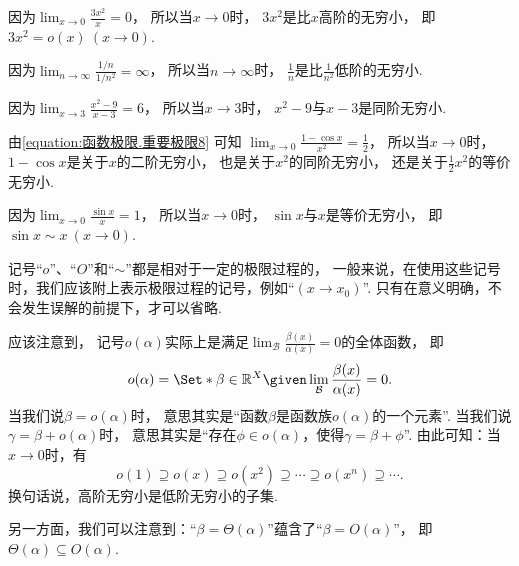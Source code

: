 \begin{example}
因为\(\lim_{x\to0} \frac{3x^2}{x} = 0\)，
所以当\(x\to0\)时，
\(3x^2\)是比\(x\)高阶的无穷小，
即\(3x^2 = o(x)\ (x\to0)\).
\end{example}

\begin{example}
因为\(\lim_{n\to\infty} \frac{1/n}{1/n^2} = \infty\)，
所以当\(n\to\infty\)时，
\(\frac{1}{n}\)是比\(\frac{1}{n^2}\)低阶的无穷小.
\end{example}

\begin{example}
因为\(\lim_{x\to3} \frac{x^2-9}{x-3} = 6\)，
所以当\(x\to3\)时，
\(x^2-9\)与\(x-3\)是同阶无穷小.
\end{example}

\begin{example}
由\cref{equation:函数极限.重要极限8} 可知
\(\lim_{x\to0} \frac{1-\cos x}{x^2} = \frac12\)，
所以当\(x\to0\)时，
\(1-\cos x\)是关于\(x\)的二阶无穷小，
也是关于\(x^2\)的同阶无穷小，
还是关于\(\frac12 x^2\)的等价无穷小.
\end{example}

\begin{example}
因为\(\lim_{x\to0} \frac{\sin x}{x} = 1\)，
所以当\(x\to0\)时，
\(\sin x\)与\(x\)是等价无穷小，
即\(\sin x \sim x\ (x\to0)\).
\end{example}

\begin{remark}
记号“\(o\)”、“\(O\)”和“\(\sim\)”都是相对于一定的极限过程的，
一般来说，在使用这些记号时，我们应该附上表示极限过程的记号，例如“\((x \to x_0)\)”.
只有在意义明确，不会发生误解的前提下，才可以省略.
\end{remark}
\begin{remark}
应该注意到，
记号\(o(\alpha)\)实际上是满足\(\lim_\mathcal{B} \frac{\beta(x)}{\alpha(x)} = 0\)的全体函数，
即\[
	o(\alpha) = \Set*{ \beta\in\mathbb{R}^X \given \lim_\mathcal{B} \frac{\beta(x)}{\alpha(x)} = 0 }.
\]
当我们说\(\beta = o(\alpha)\)时，
意思其实是“函数\(\beta\)是函数族\(o(\alpha)\)的一个元素”.
当我们说\(\gamma = \beta + o(\alpha)\)时，
意思其实是“存在\(\phi\in o(\alpha)\)，使得\(\gamma = \beta + \phi\)”.
由此可知：当\(x\to0\)时，有\[
	o(1)
	\supseteq o(x)
	\supseteq o(x^2)
	\supseteq \dotsb
	\supseteq o(x^n)
	\supseteq \dotsb.
\]
换句话说，高阶无穷小是低阶无穷小的子集.

另一方面，我们可以注意到：“\(\beta = \Theta(\alpha)\)”蕴含了“\(\beta = O(\alpha)\)”，
即\(\Theta(\alpha) \subseteq O(\alpha)\).
\end{remark}


